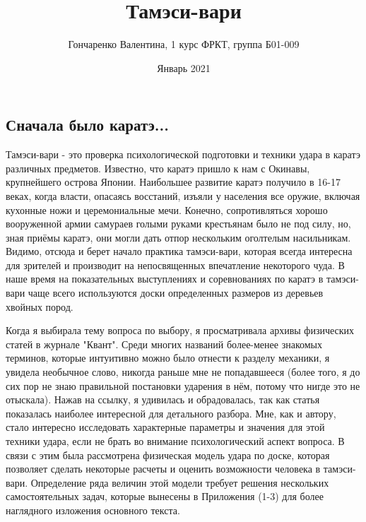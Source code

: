 \documentclass[a4paper,12pt]{article} %
\title{Тамэси-вари}
\author{Гончаренко Валентина, 1 курс ФРКТ, группа Б01-009}
\date{Январь 2021}
\begin{document}
\maketitle
\thispagestyle{empty} %

\newpage
\begin{center}
\section*{Сначала было каратэ...}
\end{center}
Тамэси-вари - это проверка психологической подготовки и техники удара в каратэ различных предметов. Известно, что каратэ пришло к нам с Окинавы, крупнейшего острова Японии. Наибольшее развитие каратэ получило в 16-17 веках, когда власти, опасаясь восстаний, изъяли у населения все оружие, включая кухонные ножи и церемониальные мечи. Конечно, сопротивляться хорошо вооруженной армии самураев голыми руками крестьянам было не под силу, но, зная приёмы каратэ, они могли дать отпор нескольким оголтелым насильникам. Видимо, отсюда и берет начало практика тамэси-вари, которая всегда интересна для зрителей и производит на непосвященных впечатление некоторого чуда. В наше время на показательных выступлениях и соревнованиях по каратэ в тамэси-вари чаще всего используются доски определенных размеров из деревьев хвойных пород.

Когда я выбирала тему вопроса по выбору, я просматривала архивы физических статей в журнале "Квант". Среди многих названий более-менее знакомых терминов, которые интуитивно можно было отнести к разделу механики, я увидела необычное слово, никогда раньше мне не попадавшееся (более того, я до сих пор не знаю правильной постановки ударения в нём, потому что нигде это не отыскала). Нажав на ссылку, я удивилась и обрадовалась, так как статья показалась наиболее интересной для детального разбора. Мне, как и автору, стало интересно исследовать характерные параметры и значения для этой техники удара, если не брать во внимание психологический аспект вопроса. В связи с этим была рассмотрена физическая модель удара по доске, которая позволяет сделать некоторые расчеты и оценить возможности человека в тамэси-вари. Определение ряда величин этой модели требует решения нескольких самостоятельных задач, которые вынесены в Приложения (1-3) для более наглядного изложения основного текста.
\end{document}
